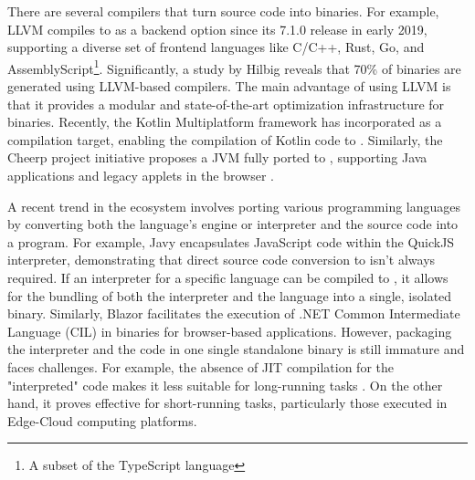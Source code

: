 There are several compilers that turn source code into \Wasm binaries. 
For example, LLVM compiles to \Wasm as a backend option since its 7.1.0 release in early 2019, supporting a diverse set of frontend languages like C/C++, Rust, Go, and AssemblyScript\footnote{A subset of the TypeScript language}.
Significantly, a study by Hilbig \cite{Hilbig2021AnES} reveals that 70\% of \Wasm binaries are generated using LLVM-based compilers. 
The main advantage of using LLVM is that it provides a modular and state-of-the-art optimization infrastructure for \Wasm binaries.
Recently, the Kotlin Multiplatform framework  has incorporated \Wasm as a compilation target, enabling the compilation of Kotlin code to \Wasm.
Similarly, the Cheerp project initiative proposes a JVM fully ported to \Wasm, supporting Java applications and legacy applets in the browser . 

\pagebreak

\pagebreak

A recent trend in the \Wasm ecosystem involves porting various programming languages by converting both the language's engine or interpreter and the source code into a \Wasm program. 
For example, Javy encapsulates JavaScript code within the QuickJS interpreter, demonstrating that direct source code conversion to \Wasm isn't always required. 
If an interpreter for a specific language can be compiled to \Wasm, it allows for the bundling of both the interpreter and the language into a single, isolated \Wasm binary. 
Similarly, Blazor facilitates the execution of .NET Common Intermediate Language (CIL) in \Wasm binaries for browser-based applications. 
However, packaging the interpreter and the code in one single standalone \Wasm binary is still immature and faces challenges.
For example, the absence of JIT compilation for the "interpreted" code makes it less suitable for long-running tasks \cite{10.1145/3593434.3593454}. 
On the other hand, it proves effective for short-running tasks, particularly those executed in Edge-Cloud computing platforms.



\label{background:wasm:binary}

